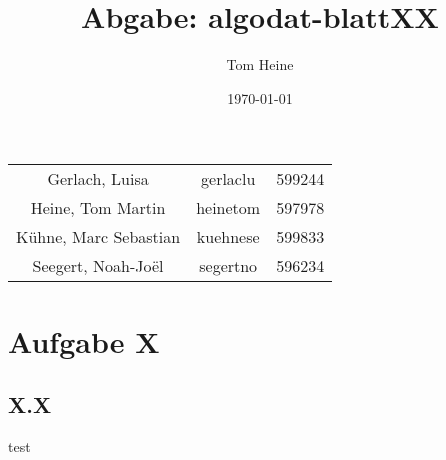 \documentclass[12pt,a4paper]{scrartcl}
\author{Tom Heine}
\title{Abgabe: algodat-blattXX}
\date{\today}
\begin{document}
	\newpage
	\begin{center}
		\begin{tabular}{ccc}
			Gerlach, Luisa&gerlaclu&599244\\
			Heine, Tom Martin&heinetom&597978\\
			Kühne, Marc Sebastian&kuehnese&599833\\
			Seegert, Noah-Joël&segertno&596234
		\end{tabular}
	\end{center}
	\section*{Aufgabe X}
	\subsection*{X.X}
		test
\end{document}
